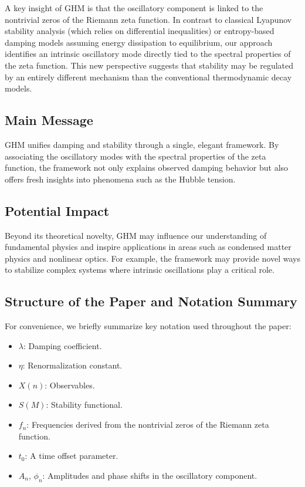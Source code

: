 \documentclass[11pt]{article}
\begin{document}
A key insight of GHM is that the oscillatory component is linked to the nontrivial zeros of the Riemann zeta function. In contrast to classical Lyapunov stability analysis (which relies on differential inequalities) or entropy-based damping models assuming energy dissipation to equilibrium, our approach identifies an intrinsic oscillatory mode directly tied to the spectral properties of the zeta function. This new perspective suggests that stability may be regulated by an entirely different mechanism than the conventional thermodynamic decay models.

\subsection{Main Message}

GHM unifies damping and stability through a single, elegant framework. By associating the oscillatory modes with the spectral properties of the zeta function, the framework not only explains observed damping behavior but also offers fresh insights into phenomena such as the Hubble tension.

\subsection{Potential Impact}

Beyond its theoretical novelty, GHM may influence our understanding of fundamental physics and inspire applications in areas such as condensed matter physics and nonlinear optics. For example, the framework may provide novel ways to stabilize complex systems where intrinsic oscillations play a critical role.

\subsection{Structure of the Paper and Notation Summary}

For convenience, we briefly summarize key notation used throughout the paper:
\begin{itemize}
    \item $\lambda$: Damping coefficient.
    \item $\eta$: Renormalization constant.
    \item $X(n)$: Observables.
    \item $S(M)$: Stability functional.
    \item $f_n$: Frequencies derived from the nontrivial zeros of the Riemann zeta function.
    \item $t_{0}$: A time offset parameter.
    \item $A_n$, $\phi_n$: Amplitudes and phase shifts in the oscillatory component.
\end{itemize}
\end{document}
